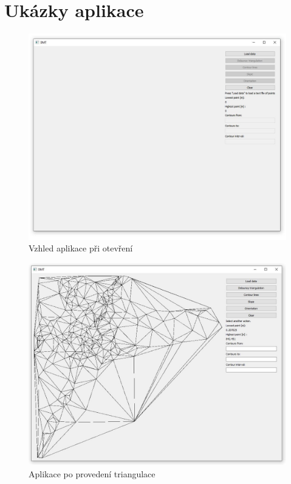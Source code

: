 \documentclass{article}
\begin{document}
\section{Ukázky aplikace} %
\begin{figure}[hp]
\centering
        \includegraphics[trim=0cm 0cm 0cm 0cm, width=1\textwidth]{startup.jpg}
        \caption{Vzhled aplikace při otevření}
\end{figure}

\begin{figure}[hp]
\centering
        \includegraphics[trim=0cm 0cm 0cm 0cm, width=1\textwidth]{triangulate.jpg}
        \caption{Aplikace po provedení triangulace}
\end{figure}
\end{document}
